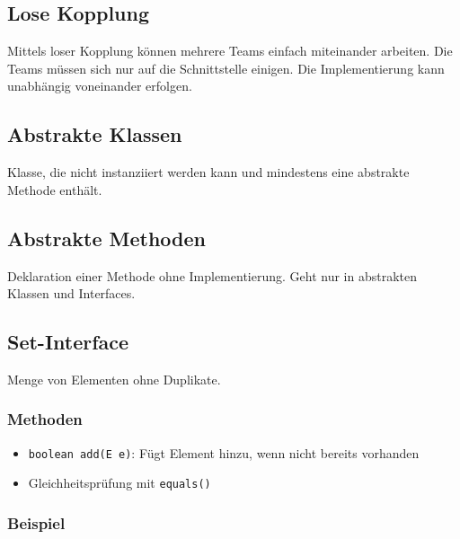 \subsection{Lose Kopplung}
Mittels loser Kopplung können mehrere Teams einfach miteinander arbeiten. 
Die Teams müssen sich nur auf die Schnittstelle einigen. 
Die Implementierung kann unabhängig voneinander erfolgen.

\begin{minipage}[t]{0.52\columnwidth}
    \subsection{Abstrakte Klassen}
    Klasse, die nicht instanziiert werden kann und mindestens eine abstrakte Methode enthält.
\end{minipage}\hfill
\begin{minipage}[t]{0.45\columnwidth}
    \subsection{Abstrakte Methoden}
    Deklaration einer Methode ohne Implementierung. Geht nur in abstrakten Klassen und Interfaces.
    
\end{minipage}

\vspace{-7mm}
\subsection{Set-Interface}
Menge von Elementen ohne Duplikate.
\subsubsection{Methoden}
\begin{itemize}
    \item \lstinline{boolean add(E e)}: Fügt Element hinzu, wenn nicht bereits vorhanden
    \item Gleichheitsprüfung mit \lstinline{equals()}
\end{itemize}

\subsubsection{Beispiel}

